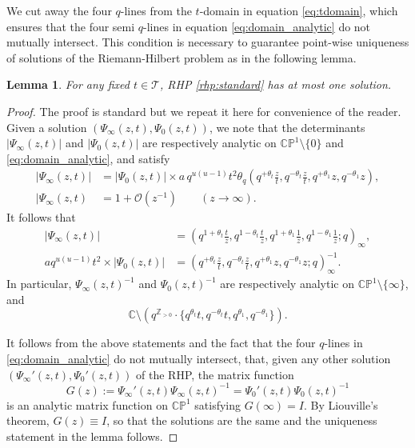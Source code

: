 \documentclass[a4paper,reqno,11pt]{amsart}
\numberwithin{equation}{section}
\numberwithin{figure}{section}
\theoremstyle{plain}
\newtheorem{lemma}[theorem]{Lemma}
\theoremstyle{remark}
\newcounter{rhp}
\numberwithin{rhp}{section}
\begin{document}
    We cut away the four $q$-lines from the $t$-domain in equation \eqref{eq:tdomain}, which ensures that the four semi $q$-lines in equation \eqref{eq:domain_analytic} do not mutually intersect. This condition is necessary to guarantee point-wise uniqueness of solutions of the Riemann-Hilbert problem as in the following lemma.
\begin{lemma}
    For any fixed $t\in \mathcal{T}$, RHP \ref{rhp:standard} has at most one solution.
\end{lemma}
\begin{proof}
The proof is standard but we repeat it here for convenience of the reader. Given a solution $(\Psi_\infty(z,t),\Psi_0(z,t))$, we note that the determinants $|\Psi_\infty(z,t)|$ and $|\Psi_0(z,t)|$
are respectively analytic on $\mathbb{CP}^1\setminus \{0\}$ and \eqref{eq:domain_analytic}, and satisfy
\begin{align*}
  |\Psi_\infty(z,t)|&=|\Psi_0(z,t)|\times a\,q^{u(u-1)}t^2 \theta_q\left(q^{+\theta_t}\frac{z}{t},q^{-\theta_t}\frac{z}{t},q^{+\theta_1}z,q^{-\theta_1}z\right), \\
  |\Psi_\infty(z,t)&=1+\mathcal{O}(z^{-1})\qquad (z\rightarrow \infty).
\end{align*}
It follows that
\begin{equation}\label{eq:det}
\begin{aligned}
   |\Psi_\infty(z,t)|&=\left(q^{1+\theta_t}\frac{t}{z},q^{1-\theta_t}\frac{t}{z},q^{1+\theta_1}\frac{1}{z},q^{1-\theta_1}\frac{1}{z};q\right)_\infty,\\
   aq^{u(u-1)}t^2\times |\Psi_0(z,t)|&= \left(q^{+\theta_t}\frac{z}{t},q^{-\theta_t}\frac{z}{t},q^{+\theta_1}z,q^{-\theta_1}z;q\right)_\infty^{-1}.
\end{aligned}
\end{equation}
In particular, $\Psi_\infty(z,t)^{-1}$ and $\Psi_0(z,t)^{-1}$ are respectively analytic on $\mathbb{CP}^1\setminus\{\infty\}$, and
\begin{equation*}
      \mathbb{C}\setminus(q^{\mathbb{Z}_{> 0}}\cdot \{q^{\theta_t}t,q^{-\theta_t}t,q^{\theta_1},q^{-\theta_1}\}).
  \end{equation*}

It follows from the above statements and the fact that the four $q$-lines in \eqref{eq:domain_analytic} do not mutually intersect,
that, given any other solution $(\Psi_\infty'(z,t),\Psi_0'(z,t))$ of the RHP,  the matrix function
\begin{equation} \label{eq:matrixG}   G(z):=\Psi_\infty'(z,t)\Psi_\infty(z,t)^{-1}=\Psi_0'(z,t)\Psi_0(z,t)^{-1}
\end{equation}
is an analytic matrix function on $\mathbb{CP}^1$ satisfying $G(\infty)=I$. By Liouville's theorem, $G(z)\equiv I$, so that the solutions are the same and the uniqueness statement in the lemma follows.
\end{proof}
\end{document}
